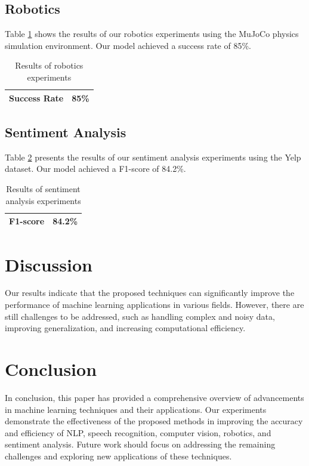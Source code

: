 \documentclass{article}
\begin{document}
\subsection{Robotics}
Table \ref{tab:robotics_results} shows the results of our robotics experiments using the MuJoCo physics simulation environment. Our model achieved a success rate of 85\%.

\begin{table}[ht]
\centering
\begin{tabular}{|c|c|}
\hline
Success Rate & 85\% \\
\hline
\end{tabular}
\caption{Results of robotics experiments}
\label{tab:robotics_results}
\end{table}

\subsection{Sentiment Analysis}
Table \ref{tab:sentiment_results} presents the results of our sentiment analysis experiments using the Yelp dataset. Our model achieved a F1-score of 84.2\%.

\begin{table}[ht]
\centering
\begin{tabular}{|c|c|}
\hline
F1-score & 84.2\% \\
\hline
\end{tabular}
\caption{Results of sentiment analysis experiments}
\label{tab:sentiment_results}
\end{table}

\section{Discussion}
Our results indicate that the proposed techniques can significantly improve the performance of machine learning applications in various fields. However, there are still challenges to be addressed, such as handling complex and noisy data, improving generalization, and increasing computational efficiency.

\section{Conclusion}
In conclusion, this paper has provided a comprehensive overview of advancements in machine learning techniques and their applications. Our experiments demonstrate the effectiveness of the proposed methods in improving the accuracy and efficiency of NLP, speech recognition, computer vision, robotics, and sentiment analysis. Future work should focus on addressing the remaining challenges and exploring new applications of these techniques.
\end{document}

